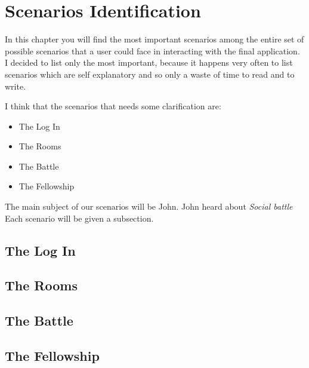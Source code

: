 \chapter{Scenarios Identification}
	In this chapter you will find the most important scenarios among the entire set of possible scenarios that a user could face in interacting with the final application.\\
	I decided to list only the most important, because it happens very often to list scenarios which are self explanatory and so only a waste of time to read and to write.

	I think that the scenarios that needs some clarification are:
	\newcommand{\scenarioLogin}{The Log In}
	\newcommand{\scenarioRooms}{The Rooms}
	\newcommand{\scenarioBattle}{The Battle}
	\newcommand{\scenarioFellowship}{The Fellowship}
	\begin{itemize}
		\item \scenarioLogin 
		\item \scenarioRooms 
		\item \scenarioBattle 
		\item \scenarioFellowship
	\end{itemize}

	The main subject of our scenarios will be John. John heard about \textit{Social battle}
	Each scenario will be given a subsection.

	\section{\scenarioLogin}
	\section{\scenarioRooms}
	\section{\scenarioBattle}
	\section{\scenarioFellowship}